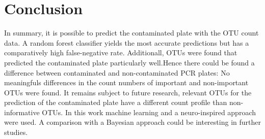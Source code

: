 \documentclass{svproc}
\begin{document}
\section{Conclusion}
%
In summary, it is possible to predict the contaminated plate with the OTU count data. A random forest classifier yields the most accurate predictions but has a comparatively high false-negative rate. Additionall, OTUs were found that predicted the contaminated plate particularly well.Hence there could be found a difference between contaminated and non-contaminated PCR plates: No meaningfuls differences in the count numbers of important and non-important OTUs were found. It remains subject to future research, relevant OTUs for the prediction of the contaminated plate have a different count profile than non-informative OTUs. In this work machine learning and a neuro-inspired approach were used. A comparison with a Bayesian approach could be interesting in further studies.

%
%
%


\end{document}
